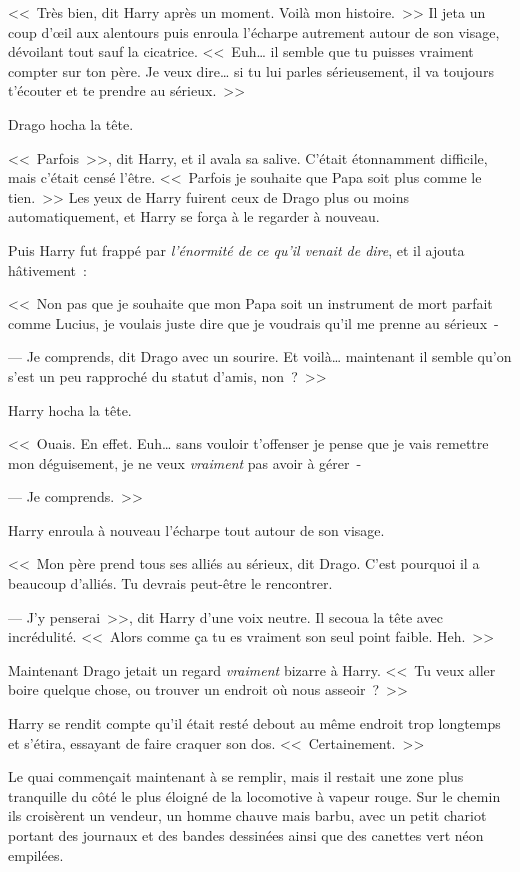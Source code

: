 <<~Très bien, dit Harry après un moment. Voilà mon histoire.~>> Il jeta un coup d'œil aux alentours puis enroula l'écharpe autrement autour de son visage, dévoilant tout sauf la cicatrice. <<~Euh… il semble que tu puisses vraiment compter sur ton père. Je veux dire… si tu lui parles sérieusement, il va toujours t'écouter et te prendre au sérieux.~>>

Drago hocha la tête.

<<~Parfois~>>, dit Harry, et il avala sa salive. C'était étonnamment difficile, mais c'était censé l'être. <<~Parfois je souhaite que Papa soit plus comme le tien.~>> Les yeux de Harry fuirent ceux de Drago plus ou moins automatiquement, et Harry se força à le regarder à nouveau.

Puis Harry fut frappé par \emph{l'énormité de ce qu'il venait de dire}, et il ajouta hâtivement~:

<<~Non pas que je souhaite que mon Papa soit un instrument de mort parfait comme Lucius, je voulais juste dire que je voudrais qu'il me prenne au sérieux~-

--- Je comprends, dit Drago avec un sourire. Et voilà… maintenant il semble qu'on s'est un peu rapproché du statut d'amis, non~?~>>

Harry hocha la tête.

<<~Ouais. En effet. Euh… sans vouloir t'offenser je pense que je vais remettre mon déguisement, je ne veux \emph{vraiment} pas avoir à gérer~-

--- Je comprends.~>>

Harry enroula à nouveau l'écharpe tout autour de son visage.

<<~Mon père prend tous ses alliés au sérieux, dit Drago. C'est pourquoi il a beaucoup d'alliés. Tu devrais peut-être le rencontrer.

--- J'y penserai~>>, dit Harry d'une voix neutre. Il secoua la tête avec incrédulité. <<~Alors comme ça tu es vraiment son seul point faible. Heh.~>>

Maintenant Drago jetait un regard \emph{vraiment} bizarre à Harry. <<~Tu veux aller boire quelque chose, ou trouver un endroit où nous asseoir~?~>>

Harry se rendit compte qu'il était resté debout au même endroit trop longtemps et s'étira, essayant de faire craquer son dos. <<~Certainement.~>>

Le quai commençait maintenant à se remplir, mais il restait une zone plus tranquille du côté le plus éloigné de la locomotive à vapeur rouge. Sur le chemin ils croisèrent un vendeur, un homme chauve mais barbu, avec un petit chariot portant des journaux et des bandes dessinées ainsi que des canettes vert néon empilées.

